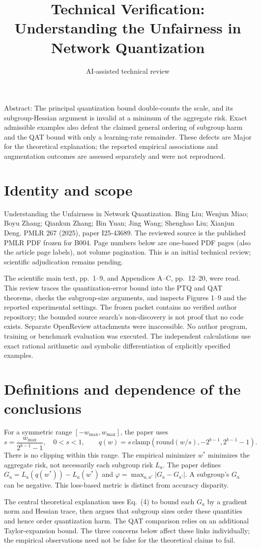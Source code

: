 \documentclass[10pt]{article}
\title{Technical Verification: Understanding the Unfairness in Network Quantization}
\author{AI-assisted technical review}
\date{}
\begin{document}
\maketitle
Abstract: The principal quantization bound double-counts the scale, and its subgroup-Hessian argument is invalid at a minimum of the aggregate risk. Exact admissible examples also defeat the claimed general ordering of subgroup harm and the QAT bound with only a learning-rate remainder. These defects are Major for the theoretical explanation; the reported empirical associations and augmentation outcomes are assessed separately and were not reproduced.\par
\section*{Identity and scope}
Understanding the Unfairness in Network Quantization. Bing Liu; Wenjun Miao; Boyu Zhang; Qiankun Zhang; Bin Yuan; Jing Wang; Shenghao Liu; Xianjun Deng. PMLR 267 (2025), paper I25-43689. The reviewed source is the published PMLR PDF frozen for B004. Page numbers below are one-based PDF pages (also the article page labels), not volume pagination. This is an initial technical review; scientific adjudication remains pending.\par
The scientific main text, pp. 1–9, and Appendices A–C, pp. 12–20, were read. This review traces the quantization-error bound into the PTQ and QAT theorems, checks the subgroup-size arguments, and inspects Figures 1–9 and the reported experimental settings. The frozen packet contains no verified author repository; the bounded source search’s non-discovery is not proof that no code exists. Separate OpenReview attachments were inaccessible. No author program, training or benchmark evaluation was executed. The independent calculations use exact rational arithmetic and symbolic differentiation of explicitly specified examples.\par
\section*{Definitions and dependence of the conclusions}
For a symmetric range \([-w_{\max},w_{\max}]\), the paper uses \[s=\frac{w_{\max}}{2^{b-1}-1},\quad 0<s<1,\qquad
 q(w)=s\,\mathrm{clamp}\!\left(\mathrm{round}(w/s),-2^{b-1},2^{b-1}-1\right).\] There is no clipping within this range. The empirical minimizer \(w^*\) minimizes the aggregate risk, not necessarily each subgroup risk \(L_a\). The paper defines \(G_a=L_a(q(w^*))-L_a(w^*)\) and \(\varphi=\max_{a,a'}|G_a-G_{a'}|\). A subgroup’s \(G_a\) can be negative. This loss-based metric is distinct from accuracy disparity.\par
The central theoretical explanation uses Eq. (4) to bound each \(G_a\) by a gradient norm and Hessian trace, then argues that subgroup sizes order these quantities and hence order quantization harm. The QAT comparison relies on an additional Taylor-expansion bound. The three concerns below affect these links individually; the empirical observations need not be false for the theoretical claims to fail.\par
\end{document}
